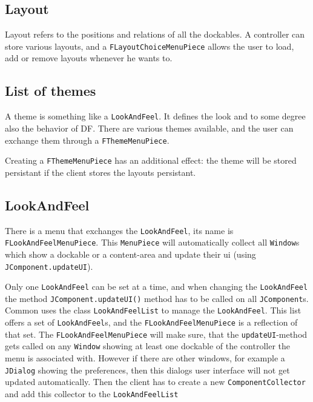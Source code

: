 \documentclass[a4paper,10pt]{article}
\newcommand{\src}[1]{\lstinline[basicstyle=\ttfamily]|#1|}
\begin{document}
\subsection{Layout}
Layout refers to the positions and relations of all the dockables. A controller can store various layouts, and a \src{FLayoutChoiceMenuPiece} allows the user to load, add or remove layouts whenever he wants to.

\subsection{List of themes}
A theme is something like a \src{LookAndFeel}. It defines the look and to some degree also the behavior of DF. There are various themes available, and the user can exchange them through a \src{FThemeMenuPiece}.

Creating a \src{FThemeMenuPiece} has an additional effect: the theme will be stored persistant if the client stores the layouts persistant.

\subsection{LookAndFeel}
There is a menu that exchanges the \src{LookAndFeel}, its name is \src{FLookAndFeelMenuPiece}. This \src{MenuPiece} will automatically collect all \src{Window}s which show a dockable or a content-area and update their ui (using \src{JComponent.updateUI}).

Only one \src{LookAndFeel} can be set at a time, and when changing the \src{LookAndFeel} the method \src{JComponent.updateUI()} method has to be called on all \src{JComponent}s. Common uses the class \src{LookAndFeelList} to manage the \src{LookAndFeel}. This list offers a set of \src{LookAndFeel}s, and the \src{FLookAndFeelMenuPiece} is a reflection of that set. The \src{FLookAndFeelMenuPiece} will make sure, that the \src{updateUI}-method gets called on any \src{Window} showing at least one dockable of the controller the menu is associated with. However if there are other windows, for example a \src{JDialog} showing the preferences, then this dialogs user interface will not get updated automatically. Then the client has to create a new \src{ComponentCollector} and add this collector to the \src{LookAndFeelList}
\end{document}
